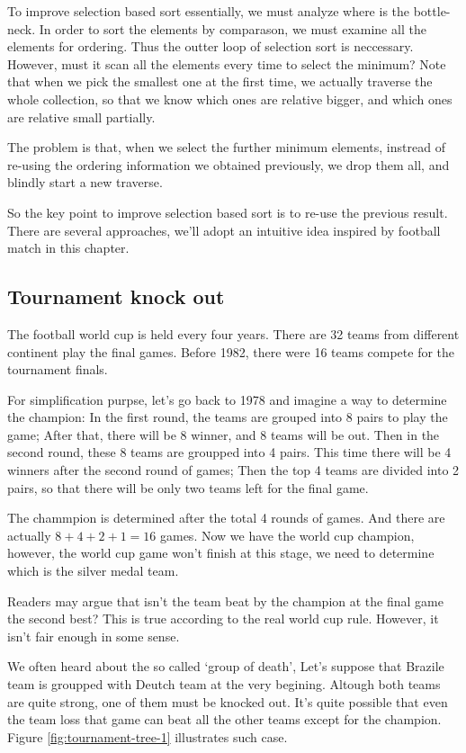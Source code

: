 \documentclass{article}
\begin{document}
To improve selection based sort essentially, we must analyze where is the bottle-neck. In order to sort
the elements by comparason, we must examine all the elements for ordering. Thus the outter loop of selection
sort is neccessary. However, must it scan all the elements every time to select the minimum? Note that
when we pick the smallest one at the first time, we actually traverse the whole collection, so that
we know which ones are relative bigger, and which ones are relative small partially.

The problem is that, when we select the further minimum elements, instread of re-using the ordering information
we obtained previously, we drop them all, and blindly start a new traverse.

So the key point to improve selection based sort is to re-use the previous result. There are several approaches, 
we'll adopt an intuitive idea inspired by football match in this chapter.

\subsection{Tournament knock out}

The football world cup is held every four years. There are 32 teams from different continent 
play the final games. Before 1982, there were 16 teams compete for the tournament finals\cite{wiki-wc}.

For simplification purpse, let's go back to 1978 and imagine a way to determine the champion: 
In the first round, the teams
are grouped into 8 pairs to play the game; After that, there will be 8 winner, and 8 teams will
be out. Then in the second round, these 8 teams are groupped into 4 pairs. This time there
will be 4 winners after the second round of games; Then the top 4 teams are divided into 
2 pairs, so that there will be only two teams left for the final game. 

The chammpion is determined after the total 4 rounds of games. And there are actually $8+4+2+1 = 16$
games. Now we have the world cup champion, however, the world cup game won't finish at this stage,
we need to determine which is the silver medal team.

Readers may argue that isn't the team beat by the champion at the final game the second best?
This is true according to the real world cup rule. However, it isn't fair enough in some sense.

We often heard about the so called `group of death', Let's suppose that Brazile team is 
groupped with Deutch team at the very begining. Altough both teams are quite strong, one of
them must be knocked out. It's quite possible that even the team loss that game can beat
all the other teams except for the champion. Figure \ref{fig:tournament-tree-1} illustrates such
case.
\end{document}
